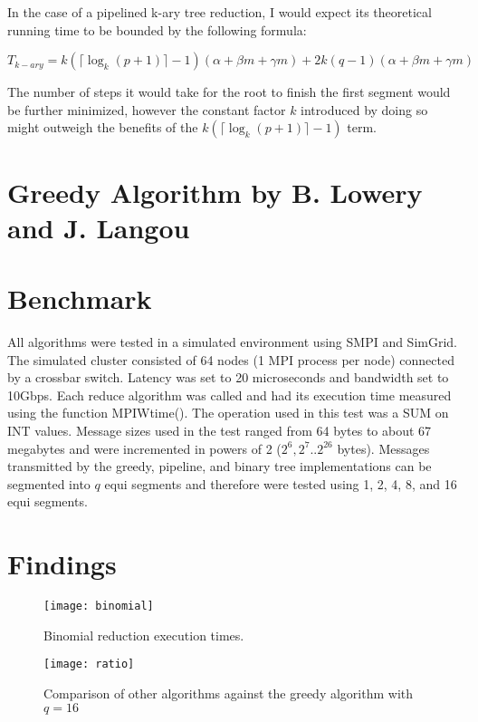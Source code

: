 \documentclass{article}
\begin{document}
\noindent In the case of a pipelined k-ary tree reduction, I would expect its theoretical running time 
to be bounded by the following formula:

$$T_{k-ary} = k(\lceil \log_k{(p+1)} \rceil - 1)(\alpha + \beta m + \gamma m) +
2k(q-1)(\alpha + \beta m + \gamma m)$$

\noindent The number of steps it would take for the root to finish the first segment would be 
further minimized, however the constant factor $k$ introduced by doing so might outweigh the benefits of the $k(\lceil \log_k{(p+1)} \rceil - 1)$ term.

\section{Greedy Algorithm by B. Lowery and J. Langou}

\section{Benchmark}

All algorithms were tested in a simulated environment using SMPI and SimGrid. The simulated
cluster consisted of 64 nodes (1 MPI process per node) connected by a crossbar switch. Latency was set to
20 microseconds and bandwidth set to 10Gbps. Each reduce algorithm was called and had its execution
time measured using the function MPIWtime(). The operation used in this test was a SUM on INT
values. Message sizes used in the test ranged from 64 bytes to about 67 megabytes and were incremented
in powers of 2 ($2^6, 2^7 .. 2^{26}$ bytes). Messages transmitted by the greedy, pipeline, and binary tree
implementations can be segmented into $q$ equi segments and therefore were tested using 1, 2, 4, 8, and 16
equi segments.

\section{Findings}

\begin{figure}[h]
    \centering
    \begin{minipage}{0.5\textwidth}
	    \texttt{[image: binomial]}
	    \caption{Binomial reduction execution times.}
	    \label{fig:binomial}
    \end{minipage}%
    \centering
    \begin{minipage}{0.5\textwidth}
	    \texttt{[image: ratio]}
	    \caption{Comparison of other algorithms against the greedy algorithm with $q=16$}
	    \label{fig:ratio}
    \end{minipage}%
\end{figure}
\end{document}
